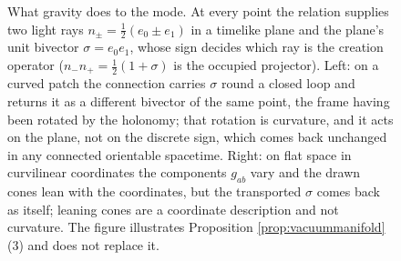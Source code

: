\documentclass[11pt]{article}
\theoremstyle{definition}
\begin{document}
\begin{figure}[ht]
\caption{What gravity does to the mode. At every point the relation supplies two light rays $n_{\pm} = \tfrac12(e_{0} \pm e_{1})$ in a timelike plane and the plane's unit bivector $\sigma = e_{0}e_{1}$, whose sign decides which ray is the creation operator ($n_{-}n_{+} = \tfrac12(1+\sigma)$ is the occupied projector). Left: on a curved patch the connection carries $\sigma$ round a closed loop and returns it as a different bivector of the same point, the frame having been rotated by the holonomy; that rotation is curvature, and it acts on the plane, not on the discrete sign, which comes back unchanged in any connected orientable spacetime. Right: on flat space in curvilinear coordinates the components $g_{ab}$ vary and the drawn cones lean with the coordinates, but the transported $\sigma$ comes back as itself; leaning cones are a coordinate description and not curvature. The figure illustrates Proposition \ref{prop:vacuummanifold}(3) and does not replace it.}
\label{fig:holonomy}
\end{figure}
\end{document}
